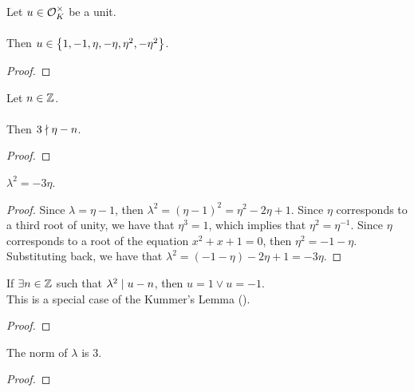 \begin{theorem}
    \label{thm:mem}
    \leanok
    Let $u \in \mathcal{O}^\times_K$ be a unit. \\\\
    Then $u \in \left\{1, -1, \eta, -\eta, \eta^2, -\eta^2\right\}$.
\end{theorem}
\begin{proof}
    \leanok
\end{proof}

\begin{theorem}
    \label{thm:not_exists_int_three_dvd_sub}
    \leanok
    Let $n \in \mathbb{Z}$. \\\\
    Then $3 \nmid \eta - n$.
\end{theorem}
\begin{proof}
    \leanok
\end{proof}

\begin{lemma}
    \label{lmm:lambda_sq}
    \leanok
    $\lambda^2 = -3 \eta$.
\end{lemma}
\begin{proof}
    \leanok
    Since $\lambda = \eta -1$, then $\lambda^2 = (\eta - 1)^2 = \eta^2 - 2\eta + 1$.
    Since $\eta$ corresponds to a third root of unity, we have that $\eta^3 = 1$,
    which implies that $\eta^2 = \eta^{-1}$.
    Since $\eta$ corresponds to a root of the equation $x^2 + x + 1 = 0$, then $\eta^2 = -1 - \eta$.
    Substituting back, we have that $\lambda^2 = (-1 - \eta) - 2\eta + 1 = -3\eta$.
\end{proof}

\begin{theorem}
    \label{lmm:eq_one_or_neg_one_of_unit_of_congruent}
    \leanok
    If $\exists n \in \mathbb{Z}$ such that $\lambda^2 \mid u - n$, then
    $u = 1 \lor u = -1$. \\
    This is a special case of the Kummer's Lemma ().
\end{theorem}
\begin{proof}
    \leanok
\end{proof}

\begin{lemma}
    \label{lmm:norm_lambda}
    \leanok
    The norm of $\lambda$ is $3$.
\end{lemma}
\begin{proof}
    \leanok
\end{proof}

